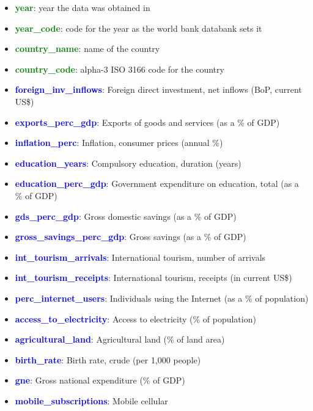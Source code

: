 \documentclass[]{article}
\providecommand{\tightlist}{%
  \setlength{\itemsep}{0pt}\setlength{\parskip}{0pt}}
\begin{document}
\begin{itemize}
\tightlist
\item
  \textcolor{green}{\textbf{year}}: year the data was obtained in
\item
  \textcolor{green}{\textbf{year\_code}}: code for the year as the world
  bank databank sets it
\item
  \textcolor{green}{\textbf{country\_name}}: name of the country
\item
  \textcolor{green}{\textbf{country\_code}}: alpha-3 ISO 3166 code for
  the country
\item
  \textcolor{blue}{\textbf{foreign\_inv\_inflows}}: Foreign direct
  investment, net inflows (BoP, current US\$)
\item
  \textcolor{blue}{\textbf{exports\_perc\_gdp}}: Exports of goods and
  services (as a \% of GDP)
\item
  \textcolor{blue}{\textbf{inflation\_perc}}: Inflation, consumer prices
  (annual \%)
\item
  \textcolor{blue}{\textbf{education\_years}}: Compulsory education,
  duration (years)
\item
  \textcolor{blue}{\textbf{education\_perc\_gdp}}: Government
  expenditure on education, total (as a \% of GDP)
\item
  \textcolor{blue}{\textbf{gds\_perc\_gdp}}: Gross domestic savings (as
  a \% of GDP)
\item
  \textcolor{blue}{\textbf{gross\_savings\_perc\_gdp}}: Gross savings
  (as a \% of GDP)
\item
  \textcolor{blue}{\textbf{int\_tourism\_arrivals}}: International
  tourism, number of arrivals
\item
  \textcolor{blue}{\textbf{int\_tourism\_receipts}}: International
  tourism, receipts (in current US\$)
\item
  \textcolor{blue}{\textbf{perc\_internet\_users}}: Individuals using
  the Internet (as a \% of population)
\item
  \textcolor{blue}{\textbf{access\_to\_electricity}}: Access to
  electricity (\% of population)
\item
  \textcolor{blue}{\textbf{agricultural\_land}}: Agricultural land (\%
  of land area)
\item
  \textcolor{blue}{\textbf{birth\_rate}}: Birth rate, crude (per 1,000
  people)
\item
  \textcolor{blue}{\textbf{gne}}: Gross national expenditure (\% of GDP)
\item
  \textcolor{blue}{\textbf{mobile\_subscriptions}}: Mobile cellular

\end{itemize}
\end{document}
